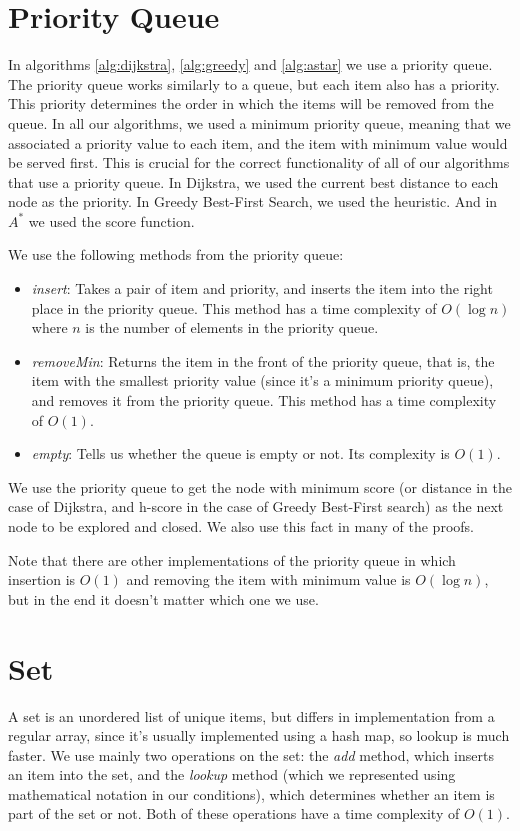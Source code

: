 \documentclass[12pt]{report}
\begin{document}
\begin{appendices}
\section{Priority Queue}
\label{annex:priorityqueue}
In algorithms \ref{alg:dijkstra}, \ref{alg:greedy} and \ref{alg:astar} we use a priority queue. The priority queue works similarly to a queue, but each item also has a priority. This priority determines the order in which the items will be removed from the queue. In all our algorithms, we used a minimum priority queue, meaning that we associated a priority value to each item, and the item with minimum value would be served first. This is crucial for the correct functionality of all of our algorithms that use a priority queue. In Dijkstra, we used the current best distance to each node as the priority. In Greedy Best-First Search, we used the heuristic. And in $A^*$ we used the score function.

We use the following methods from the priority queue:
\begin{itemize}
\item \emph{insert}: Takes a pair of item and priority, and inserts the item into the right place in the priority queue. This method has a time complexity of $O(\log n)$ where $n$ is the number of elements in the priority queue.
\item \emph{removeMin}: Returns the item in the front of the priority queue, that is, the item with the smallest priority value (since it's a minimum priority queue), and removes it from the priority queue. This method has a time complexity of $O(1)$.
\item \emph{empty}: Tells us whether the queue is empty or not. Its complexity is $O(1)$.
\end{itemize}

We use the priority queue to get the node with minimum score (or distance in the case of Dijkstra, and h-score in the case of Greedy Best-First search) as the next node to be explored and closed. We also use this fact in many of the proofs.

Note that there are other implementations of the priority queue in which insertion is $O(1)$ and removing the item with minimum value is $O(\log n)$, but in the end it doesn't matter which one we use.

\section{Set}
A set is an unordered list of unique items, but differs in implementation from a regular array, since it's usually implemented using a hash map, so lookup is much faster. We use mainly two operations on the set: the \emph{add} method, which inserts an item into the set, and the \emph{lookup} method (which we represented using mathematical notation in our conditions), which determines whether an item is part of the set or not. Both of these operations have a time complexity of $O(1)$.


\end{appendices}
\end{document}
